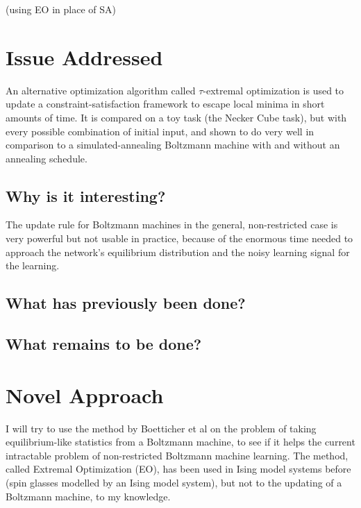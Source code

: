 \documentclass[12pt]{article}
\begin{document}
  (using EO in place of SA)


\section*{Issue Addressed} %

An alternative optimization algorithm called $\tau$-extremal optimization is used to update a constraint-satisfaction framework to escape local minima in short amounts of time. It is compared on a toy task (the Necker Cube task), but with every possible combination of initial input, and shown to do very well in comparison to a simulated-annealing Boltzmann machine with and without an annealing schedule.

\subsection*{Why is it interesting?}

The update rule for Boltzmann machines in the general, non-restricted case is very powerful but not usable in practice, because of the enormous time needed to approach the network's equilibrium distribution and the noisy learning signal for the learning.
\subsection*{What has previously been done?}
\subsection*{What remains to be done?}

\section{Novel Approach}

I will try to use the method by Boetticher et al on the problem of taking equilibrium-like statistics from a Boltzmann machine, to see if it helps the current intractable problem of non-restricted Boltzmann machine learning. The method, called Extremal Optimization (EO), has been used in Ising model systems before (spin glasses modelled by an Ising model system), but not to the updating of a Boltzmann machine, to my knowledge. %
\end{document}
